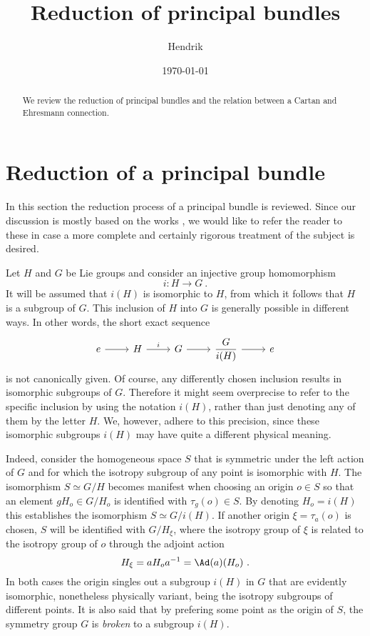 \documentclass[11pt]{article}
\title{Reduction of principal bundles}
\author{Hendrik}
\date{\today}
\begin{document}
\maketitle

\begin{abstract}
	We review the reduction of principal bundles and the relation 
	between a Cartan and Ehresmann connection.
\end{abstract}

\section{Reduction of a principal bundle}

In this section the reduction process of a principal bundle is 
reviewed. Since our discussion is mostly based on the works 
\cite{husemoller:1966fibre,husemoller.etal:2008bbt,kob1996found}, 
we would like to refer the reader to these in case a more 
complete and certainly rigorous treatment of the subject is 
desired.

Let $H$ and $G$ be Lie groups and consider an injective group 
homomorphism
\begin{displaymath}
	i : H \to G~.
\end{displaymath}
It will be assumed that $i(H)$ is isomorphic to $H$, from which 
it follows that $H$ is a subgroup of $G$.  This inclusion of $H$ 
into $G$ is generally possible in different ways.  In other 
words, the short exact sequence
\begin{displaymath}
\begin{tikzcd}
	e \rar & H \rar{i} & G \rar & \dfrac{G}{i(H)} \rar & e
\end{tikzcd}
\end{displaymath}
is not canonically given. Of course, any differently chosen 
inclusion results in isomorphic subgroups of $G$.  Therefore it 
might seem overprecise to refer to the specific inclusion by 
using the notation $i(H)$, rather than just denoting any of them 
by the letter $H$. We, however, adhere to this precision, since 
these isomorphic subgroups $i(H)$ may have quite a different 
physical meaning.

Indeed, consider the homogeneous space $S$ that is symmetric 
under the left action of $G$ and for which the isotropy subgroup 
of any point is isomorphic with $H$. The isomorphism $S \simeq 
G/H$ becomes manifest when choosing an origin $o \in S$ so that 
an element $gH_o \in G/H_o$ is identified with $\tau_g(o) \in S$.  
By denoting $H_o = i(H)$ this establishes the isomorphism $S 
\simeq G/i(H)$. If another origin $\xi = \tau_a(o)$ is chosen, 
$S$ will be identified with $G/H_\xi$, where the isotropy group 
of $\xi$ is related to the isotropy group of $o$ through the 
adjoint action
\begin{displaymath}
	H_\xi = a H_o a^{-1} = \Ad(a)(H_o)~.
\end{displaymath}
In both cases the origin singles out a subgroup $i(H)$ in $G$ 
that are evidently isomorphic, nonetheless physically variant, 
being the isotropy subgroups of different points. It is also said 
that by prefering some point as the origin of $S$, the symmetry 
group $G$ is \emph{broken} to a subgroup $i(H)$.
\end{document}
